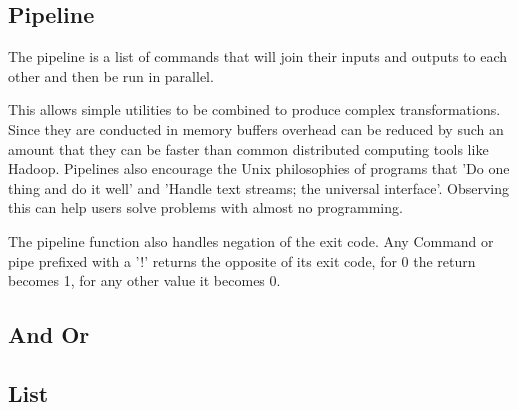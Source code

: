 \subsection{Pipeline}
The pipeline is a list of commands that will join their inputs and outputs to each other and then be run in parallel.

This allows simple utilities to be combined to produce complex transformations.
Since they are conducted in memory buffers overhead can be reduced by such an amount that they can be faster than common distributed computing tools like Hadoop\cite{AdamD45:online}.
Pipelines also encourage the Unix philosophies of programs that 'Do one thing and do it well' and 'Handle text streams; the universal interface'.
Observing this can help users solve problems with almost no programming\cite{LITERATE-VS-SHELL}.


The pipeline function also handles negation of the exit code.
Any Command or pipe prefixed with a '!' returns the opposite of its exit code, for 0 the return becomes 1, for any other value it becomes 0.

\subsection{And Or}


\subsection{List}













